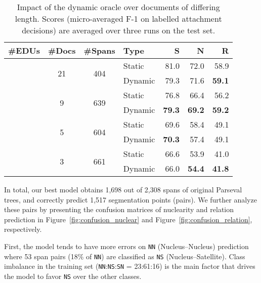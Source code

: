 \documentclass[11pt,a4paper]{article}
\newcommand{\rstrel}[1]{\texttt{#1}\xspace}
\newcommand{\figref}[2][]{Figure#1~\ref{fig:#2}}
\begin{document}
\begin{table}[t]
	\begin{center}
		\begin{adjustbox}{max width=1\linewidth}
			\begin{tabular}{rcclrrr}
				\toprule
				\textbf{\#EDUs} & \textbf{\#Docs} & \textbf{\#Spans} & \textbf{Type} & \textbf{S} & \textbf{N} & \textbf{R} \\\midrule
				\multirow{2}{*}{} & \multirow{2}{*}{21} &\multirow{2}{*}{404} & Static & 81.0 & 72.0 & 58.9 \\& & & Dynamic & 79.3 & 71.6 & \textbf{59.1} \\\midrule
				\multirow{2}{*}{} & \multirow{2}{*}{9} &\multirow{2}{*}{639} & Static & 76.8 &  66.4 & 56.2 \\& & & Dynamic & \textbf{79.3} & \textbf{69.2} & \textbf{59.2} \\\midrule
				\multirow{2}{*}{} & \multirow{2}{*}{5} &\multirow{2}{*}{604} & Static & 69.6 & 58.4 & 49.1 \\& & & Dynamic & \textbf{70.3} & 57.4 & 49.1 \\\midrule
				\multirow{2}{*}{} & \multirow{2}{*}{3} &\multirow{2}{*}{661} & Static & 66.6 & 53.9 & 41.0 \\& & & Dynamic & 66.0 & \textbf{54.4} & \textbf{41.8} \\\bottomrule
			\end{tabular}
		\end{adjustbox}
	\end{center}
	\caption{\label{tab:analisis1} Impact of the dynamic oracle over
		documents of differing length.  Scores (micro-averaged F-1 on labelled attachment decisions) are averaged over three
		runs on the test set.}\end{table}



In total, our best model obtains 1,698 out of 2,308 spans of original Parseval trees, and correctly predict 1,517 segmentation points (pairs). We further analyze these pairs by presenting the confusion matrices of 
nuclearity and relation prediction in \figref{confusion_nuclear} and \figref{confusion_relation}, respectively.

First, the model tends to have more errors on \rstrel{NN} 
(Nucleus--Nucleus) prediction where 53 span pairs (18\% of \rstrel{NN}) 
are classified as \rstrel{NS} (Nucleus--Satellite). Class imbalance in the training set (\rstrel{NN}:\rstrel{NS}:\rstrel{SN} = 23:61:16) is the main factor that drives the model to favor \rstrel{NS} over the other classes.
\end{document}
